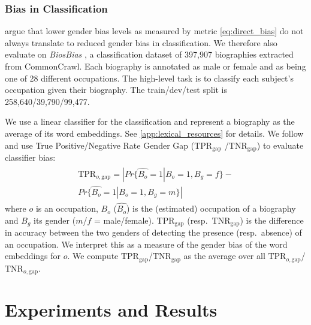 \documentclass[11pt,a4paper]{article}
\begin{document}
\subsubsection{Bias in Classification}

\citet{prost19biasTextClassif} argue that lower gender bias
levels as measured by metric  \eqref{eq:direct_bias}
do not always translate to reduced gender bias in
classification. We therefore also
evaluate on \textit{BiosBias} 
\citep{de19biosbias}, a classification dataset of 397,907 biographies
extracted from
CommonCrawl.
Each biography is annotated as male or female and as being
one
of 
28 different occupations. The high-level task is to
classify each subject's occupation given their
biography.
The train/dev/test split is 
258,640/39,790/99,477.


We use a linear classifier for the classification and
represent a biography as the average of its word
embeddings. See \ref{app:lexical_resources} for details.
We follow \citet{hardt16equality} and use
True Positive/Negative
Rate Gender Gap ($\text{TPR}_{\text{gap}}$
/$\text{TNR}_{\text{gap}}$) to evaluate classifier bias:
\begin{align}
\begin{split}
    \label{eq:TPR}
\text{TPR}_{o,\text{gap}} \!=\!     |Pr\{\hat{B_o}\!=\!1|B_o\!=\!1,B_g\!=\!f\} -\\ Pr\{\hat{B_o}\!=\!1|B_o\!=\!1,B_g\!=\!m\}|
\end{split}
\end{align}
where $o$ is an occupation,
$B_o$ ($\hat{B_o}$) is the (estimated) occupation of a
biography and $B_g$ its gender ($m$/$f$ = male/female).
$\text{TPR}_{\text{gap}}$
(resp.\ $\text{TNR}_{\text{gap}}$)
is the
difference in accuracy between the two genders of
detecting the presence (resp.\ absence) of an occupation.
We interpret this as a measure of the gender bias of the
word embeddings for $o$.
  We compute
  $\text{TPR}_{\text{gap}}$/$\text{TNR}_{\text{gap}}$ as the average over all
  $\text{TPR}_{o,\text{gap}}$/$\text{TNR}_{o,\text{gap}}$.

\section{Experiments and Results} \label{sec:results}
\end{document}
